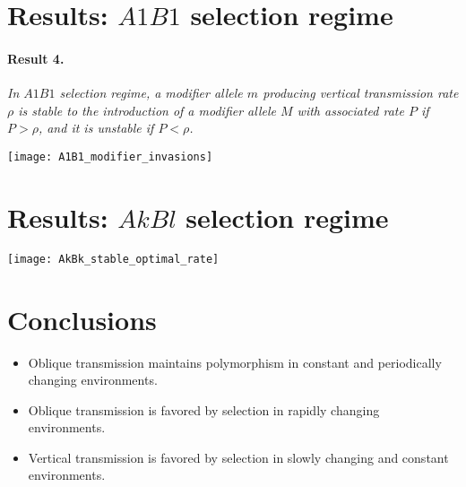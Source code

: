\documentclass[a0,landscape]{a0poster}
\begin{document}
\begin{multicols}{4}
\section*{Results: $A1B1$ selection regime}

\paragraph*{Result 4.}\textit{In $A1B1$ selection regime, a modifier allele $m$ producing vertical transmission rate $\rho$ is stable to the introduction of a modifier allele $M$ with associated rate $P$ if $P>\rho$, and it is unstable if $P<\rho$.
}

\begin{center}\vspace{1cm}
\texttt{[image: A1B1\_modifier\_invasions]}
\end{center}\vspace{1cm}

\section*{Results: $AkBl$ selection regime}

\begin{center}\vspace{1cm}
\texttt{[image: AkBk\_stable\_optimal\_rate]}
\end{center}\vspace{1cm}

\section*{Conclusions}

\begin{itemize}
\item Oblique transmission maintains polymorphism in constant and periodically changing environments.
\item Oblique transmission is favored by selection in rapidly changing environments.
\item Vertical transmission is favored by selection in slowly changing and constant environments.
\end{itemize}


\end{multicols}
\end{document}

